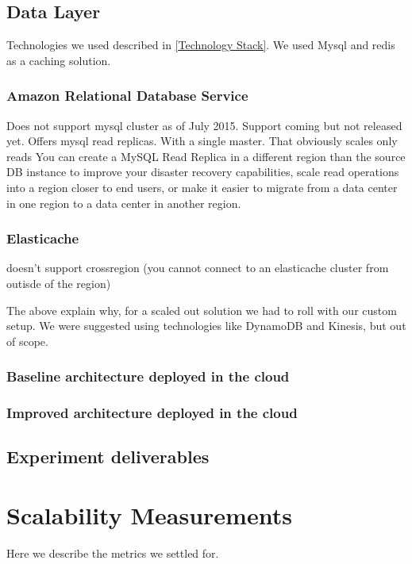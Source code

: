 \documentclass{uvamscse}
\begin{document}
\section{Data Layer}

Technologies we used described in \ref{Technology Stack}. We used Mysql and redis as a caching solution.

\subsection{Amazon Relational Database Service}
Does not support mysql cluster as of July 2015. Support coming but not released yet.
Offers mysql read replicas. With a single master. That obviously scales only reads
You can create a MySQL Read Replica in a different region than the source DB instance to improve your disaster recovery capabilities, scale read operations into a region closer to end users, or make it easier to migrate from a data center in one region to a data center in another region.

\subsection{Elasticache}
doesn't support crossregion (you cannot connect to an elasticache cluster from outisde of the region)

The above explain why, for a scaled out solution we had to roll with our custom setup. We were suggested using technologies like DynamoDB and Kinesis, but out of scope.

\subsection{Baseline architecture deployed in the cloud}

\subsection{Improved architecture deployed in the cloud}

\section{Experiment deliverables}\label{Experiment deliverables}


\chapter{Scalability Measurements} \label{Scalability Measurements}
Here we describe the metrics we settled for.
\end{document}
